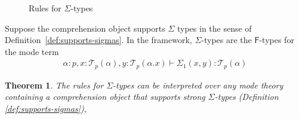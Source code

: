 \documentclass[10pt]{article}
\newtheorem{theorem}{Theorem}
\theoremstyle{definition}
\newcommand{\yields}{\vdash}
\newcommand\El[2]{\mathcal{T}_{#1}(#2)}
\newcommand\qvar[1]{\ensuremath{\mathsf{var}_{#1}}}
\newcommand\qpair[1]{\ensuremath{\mathsf{pair}_{#1}}}
\begin{document}
\begin{figure}
\caption{Rules for $\Sigma$-types}\label{fig:qit-sigma-rules}
\end{figure}

Suppose the comprehension object supports $\Sigma$ types in the sense of Definition~\ref{def:supports-sigmas}. In the framework, $\Sigma$-types are the $\mathsf{F}$-types for the mode term
\begin{align*}
\alpha : p, x : \El{p}{\alpha}, y : \El{p}{\alpha.x} \yields \Sigma_1(x,y) : \El{p}{\alpha}
\end{align*}

\begin{theorem}
The rules for $\Sigma$-types can be interpreted over any mode theory containing a comprehension object that supports strong $\Sigma$-types (Definition \ref{def:supports-sigmas}), 
\end{theorem}
\end{document}
